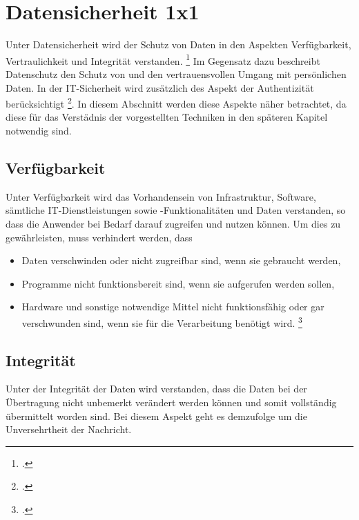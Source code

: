 \chapter{Datensicherheit 1x1}
Unter Datensicherheit wird der Schutz von Daten in den Aspekten Verfügbarkeit, Vertraulichkeit und Integrität verstanden. \footcite{BSI2014} Im Gegensatz dazu beschreibt Datenschutz den Schutz von und den vertrauensvollen Umgang mit persönlichen Daten. In der IT-Sicherheit wird zusätzlich des Aspekt der Authentizität berücksichtigt \footcite{Berliner2014}. In diesem Abschnitt werden diese Aspekte näher betrachtet, da diese für das Verstädnis der vorgestellten Techniken in den späteren Kapitel notwendig sind.

\section{Verfügbarkeit}

Unter Verfügbarkeit wird das Vorhandensein von Infrastruktur, Software, sämtliche IT-Dienstleistungen sowie -Funktionalitäten und Daten verstanden, so dass die Anwender bei Bedarf darauf zugreifen und nutzen können. Um dies zu gewährleisten, muss verhindert werden, dass
\begin{itemize}
\item Daten verschwinden oder nicht zugreifbar sind, wenn sie gebraucht werden,
\item Programme nicht funktionsbereit sind, wenn sie aufgerufen werden sollen,
\item Hardware und sonstige notwendige Mittel nicht funktionsfähig oder gar verschwunden sind, wenn sie für die Verarbeitung benötigt wird. \footcite{Berliner2014}
\end{itemize}

\section{Integrität}
Unter der Integrität der Daten wird verstanden, dass die Daten bei der Übertragung nicht unbemerkt verändert werden können und somit vollständig übermittelt worden sind. Bei diesem Aspekt geht es demzufolge um die Unversehrtheit der Nachricht.

